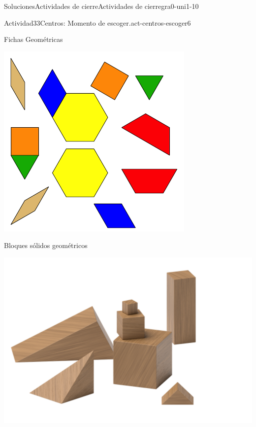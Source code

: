 \documentclass[twoside,10pt,]{article}
\begin{document}
\begin{solutions-section}{Soluciones}{Actividades de cierre}{}{Actividades de cierre}{}{}{gra0-uni1-10}
\begin{activitysolution}{Actividad}{33}{Centros: Momento de escoger.}{act-centros-escoger6}
\begin{sidebyside}{2}{0.025}{0.025}{0.05}
\begin{sbspanel}{0.45}
\end{sbspanel}%
\begin{sbspanel}{0.45}%
Fichas Geométricas%
\par
\includegraphics[width=\linewidth]{external/svg-source/tikz-file-147344.pdf}
\end{sbspanel}%
\end{sidebyside}%
\begin{sidebyside}{2}{0.025}{0.025}{0.05}%
\begin{sbspanel}{0.45}%
Bloques sólidos geométricos%
\par
\includegraphics[width=\linewidth]{external/png-source/K.1.A Beta Student Workbook.Geoblocks.png}

\end{sbspanel}
\end{sidebyside}
\end{activitysolution}
\end{solutions-section}
\end{document}
